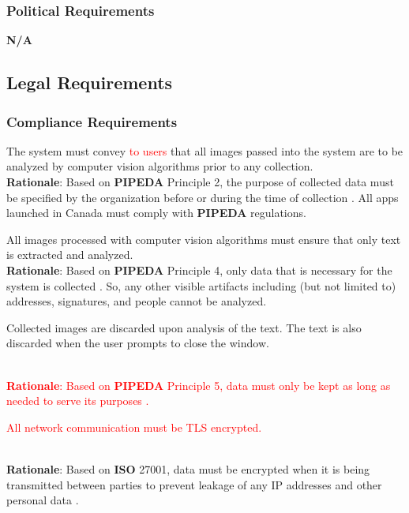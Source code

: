 \subsubsection{Political Requirements}
\label{ssub:political_requirements}
\textbf{N/A}


\subsection{Legal Requirements}
\label{sub:legal_requirements}

\subsubsection{Compliance Requirements}
\label{ssub:compliance_requirements}
\begin{enumerate}[{LR-COMP}1. ]
	\item The system must convey \textcolor{red}{to users} that all images passed into the system are to be analyzed by computer vision algorithms prior to any collection.
	\\ \textbf{Rationale}: Based on \textbf{PIPEDA} Principle 2, the purpose of collected data must be specified by the organization before or during the time of collection \cite{PIPEDA2025}. All apps launched in Canada must comply with \textbf{PIPEDA} regulations.
	\item All images processed with computer vision algorithms must ensure that only text is extracted and analyzed.
	\\ \textbf{Rationale}: Based on \textbf{PIPEDA} Principle 4, only data that is necessary for the system is collected \cite{PIPEDA2025}. So, any other visible artifacts including (but not limited to) addresses, signatures, and people cannot be analyzed.
	\item Collected images are discarded upon analysis of the text. The text is also discarded when the user prompts to close the window.
	\textcolor{red}{\\ \textbf{Rationale}: Based on \textbf{PIPEDA} Principle 5, data must only be kept as long as needed to serve its purposes \cite{PIPEDA2025}.
	\item All network communication must be TLS encrypted.}
	\\ \textbf{Rationale}: Based on \textbf{ISO} 27001, data must be encrypted when it is being transmitted between parties to prevent leakage of any IP addresses and other personal data \cite{ISMS2025}.
\end{enumerate}

